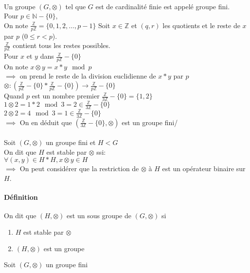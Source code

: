 \documentclass{report}
\newcommand{\Z}{\mathbb{Z}}
\newcommand{\N}{\mathbb{N}}
\begin{document}
\begin{itemize}
		\paragraph{}
		Un groupe $(G, \otimes)$ tel que $G$ est de cardinalité finie est appelé groupe fini.\\
		Pour $p \in \N-\{0\}$,\\
		On note $\frac{\Z}{p\Z}=\{0,1,2,\dots,p-1\}$
		Soit $x \in \Z$ et $(q,r)$ les quotients et le reste de $x$ par $p$ ($0\leq r < p$).\\
		$\frac{\Z}{p\Z}$ contient tous les restes possibles.\\
		Pour $x$ et $y$ dans $\frac{\Z}{p\Z}-\{0\}$ \\
		On note $x \otimes y = x*y \mod p$\\
		$\implies$ on prend le reste de la division euclidienne de $x*y$ par $p$\\
		$\otimes : (\frac{\Z}{p\Z}-\{0\}*\frac{\Z}{p\Z}-\{0\})\to \frac{\Z}{p\Z}-\{0\}$\\
		Quand $p$ est un nombre premier $\frac{\Z}{3\Z}-\{0\}=\{1,2\}$\\
		$1\otimes 2 = 1*2 \mod 3 = 2 \in \frac{\Z}{3\Z}-\{0\}$\\
		$2\otimes 2 = 4 \mod 3 = 1 \in \frac{\Z}{3\Z}-\{0\}$\\
		$\implies$ On en déduit que $(\frac{\Z}{3\Z}-\{0\},\otimes)$ est un groupe fini/
		\paragraph{}
		Soit $(G,\otimes)$ un groupe fini et $H < G$\\
		On dit que $H$ est stable par $\otimes$ ssi:\\
		$\forall(x,y) \in H*H, x \otimes y \in H$\\
		$\implies$ On peut considérer que la restriction de $\otimes$ à $H$ est un opérateur binaire sur $H$.
		\paragraph{Définition}
		On dit que $(H,\otimes)$ est un sous groupe de $(G,\otimes)$ si
		\begin{enumerate}
			\item $H$ est stable par $\otimes$
			\item $(H,\otimes)$ est un groupe
		\end{enumerate}
		Soit $(G,\otimes)$ un groupe fini\\
		
	\end{itemize}
\end{document}
